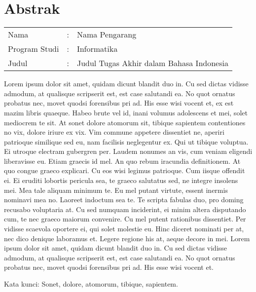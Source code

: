 \chapter*{Abstrak}

\begin{longtable}{@{}p{2.5cm} l p{10.3cm}}
	Nama 			& : & Nama Pengarang \\
	Program Studi	& : & Informatika \\
	Judul			& : & Judul Tugas Akhir dalam Bahasa Indonesia \\
\end{longtable}

Lorem ipsum dolor sit amet, quidam dicunt blandit duo in. Cu sed dictas vidisse admodum, at qualisque scripserit est, est case salutandi ea. No quot ornatus probatus nec, movet quodsi forensibus pri ad. His esse wisi vocent et, ex est mazim libris quaeque. Habeo brute vel id, inani volumus adolescens et mei, solet mediocrem te sit. At sonet dolore atomorum sit, tibique sapientem contentiones no vix, dolore iriure ex vix. Vim commune appetere dissentiet ne, aperiri patrioque similique sed eu, nam facilisis neglegentur ex. Qui ut tibique voluptua. Ei utroque electram gubergren per. Laudem nonumes an vis, cum veniam eligendi liberavisse eu. Etiam graecis id mel. An quo rebum iracundia definitionem. At quo congue graeco explicari. Cu eos wisi legimus patrioque. Cum iisque offendit ei. Ei eruditi lobortis pericula sea, te graeco salutatus sed, ne integre insolens mei. Mea tale aliquam minimum te. Eu mel putant virtute, essent inermis nominavi mea no. Laoreet indoctum sea te. Te scripta fabulas duo, pro doming recusabo voluptaria at. Cu sed numquam inciderint, ei minim altera disputando cum, te nec graeco maiorum convenire. Cu mel putent rationibus dissentiet. Per vidisse scaevola oportere ei, qui solet molestie eu. Hinc diceret nominati per at, nec dico denique laboramus et. Legere regione his at, aeque decore in mei. Lorem ipsum dolor sit amet, quidam dicunt blandit duo in. Cu sed dictas vidisse admodum, at qualisque scripserit est, est case salutandi ea. No quot ornatus probatus nec, movet quodsi forensibus pri ad. His esse wisi vocent et. 

\noindent Kata kunci: Sonet, dolore, atomorum, tibique, sapientem.